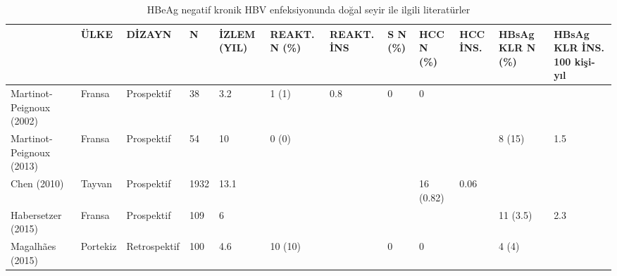\begin{table}
\begin{minipage}[c]{\textwidth}
\renewcommand{\arraystretch}{1.3} %
\centering
\begin{threeparttable}
\caption[HBeAg negatif kronik HBV enfeksiyonunda doğal seyir ile ilgili literatüler]{HBeAg negatif kronik HBV enfeksiyonunda doğal seyir ile ilgili literatürler} \label{tablo:lit} %
{\scriptsize \begin{tabular}{llllL{1cm}L{1.4cm}L{1.4cm}llL{1cm}L{1.7cm}L{1.7cm}}
\toprule\toprule
                         & \textbf{ÜLKE} & \textbf{DİZAYN} & \textbf{N} & \textbf{İZLEM (YIL)} & \textbf{REAKT. N (\%)} & \textbf{REAKT. İNS} & \textbf{S N (\%)} & \textbf{HCC N (\%)} & \textbf{HCC İNS.} & \textbf{HBsAg KLR N (\%)} & \textbf{HBsAg KLR İNS. 100 kişi-yıl} \\
\midrule
Martinot-Peignoux (2002) \cite{martinot2002serum}  \: & Fransa        & Prospektif      & 38         & 3.2                & 1 (1)                  & 0.8                      & 0                & 0                  &                        &                           &                              \\
Martinot-Peignoux (2013) \cite{martinot2013prediction}  \: & Fransa        & Prospektif      & 54         & 10                 & 0 (0)                  &                          &                  &                    &                        & 8 (15)                    & 1.5           \\
Chen (2010) \cite{chen2010carriers}             & Tayvan        & Prospektif      & 1932       & 13.1               &                        &                          &                  & 16 (0.82)          & 0.06                   &                           &                              \\
Habersetzer (2015) \cite{habersetzer2015loss}      & Fransa        & Prospektif      & 109        & 6                  &                        &                          &                  &                    &                        & 11 (3.5)                  & 2.3         \\
Magalhães (2015) \cite{magalhaes2015hepatitis}  \:       & Portekiz      & Retrospektif    & 100        & 4.6                & 10 (10)                &                          & 0                & 0                  &                        & 4 (4)                     &                              \\

\end{tabular}}
\end{threeparttable}
\end{minipage}
\end{table}
